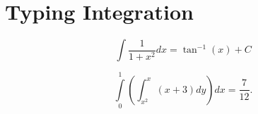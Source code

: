 \documentclass{article}
\begin{document}
	
\section{Typing Integration}

\begin{equation}
\int \frac{1} {1+x^2} dx = \tan^{-1}(x) + C
\end{equation}

\begin{equation}
	\int\limits_0^1 \left(  \int_{x^2}^x (x + 3) dy   \right) dx = \frac{7}{12}.
\end{equation}
\end{document}
